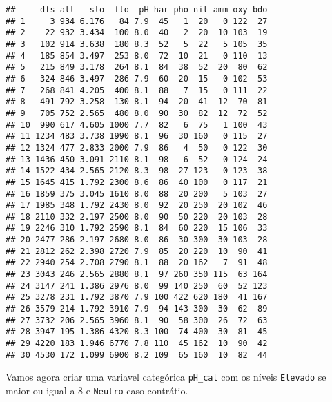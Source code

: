 \documentclass[
]{book}
\newenvironment{Shaded}{\begin{snugshade}}{\end{snugshade}}
\newcommand{\DataTypeTok}[1]{\textcolor[rgb]{0.13,0.29,0.53}{#1}}
\newcommand{\DecValTok}[1]{\textcolor[rgb]{0.00,0.00,0.81}{#1}}
\newcommand{\KeywordTok}[1]{\textcolor[rgb]{0.13,0.29,0.53}{\textbf{#1}}}
\newcommand{\NormalTok}[1]{#1}
\newcommand{\OperatorTok}[1]{\textcolor[rgb]{0.81,0.36,0.00}{\textbf{#1}}}
\newcommand{\StringTok}[1]{\textcolor[rgb]{0.31,0.60,0.02}{#1}}
\begin{document}
\begin{verbatim}
##     dfs alt   slo  flo  pH har pho nit amm oxy bdo
## 1     3 934 6.176   84 7.9  45   1  20   0 122  27
## 2    22 932 3.434  100 8.0  40   2  20  10 103  19
## 3   102 914 3.638  180 8.3  52   5  22   5 105  35
## 4   185 854 3.497  253 8.0  72  10  21   0 110  13
## 5   215 849 3.178  264 8.1  84  38  52  20  80  62
## 6   324 846 3.497  286 7.9  60  20  15   0 102  53
## 7   268 841 4.205  400 8.1  88   7  15   0 111  22
## 8   491 792 3.258  130 8.1  94  20  41  12  70  81
## 9   705 752 2.565  480 8.0  90  30  82  12  72  52
## 10  990 617 4.605 1000 7.7  82   6  75   1 100  43
## 11 1234 483 3.738 1990 8.1  96  30 160   0 115  27
## 12 1324 477 2.833 2000 7.9  86   4  50   0 122  30
## 13 1436 450 3.091 2110 8.1  98   6  52   0 124  24
## 14 1522 434 2.565 2120 8.3  98  27 123   0 123  38
## 15 1645 415 1.792 2300 8.6  86  40 100   0 117  21
## 16 1859 375 3.045 1610 8.0  88  20 200   5 103  27
## 17 1985 348 1.792 2430 8.0  92  20 250  20 102  46
## 18 2110 332 2.197 2500 8.0  90  50 220  20 103  28
## 19 2246 310 1.792 2590 8.1  84  60 220  15 106  33
## 20 2477 286 2.197 2680 8.0  86  30 300  30 103  28
## 21 2812 262 2.398 2720 7.9  85  20 220  10  90  41
## 22 2940 254 2.708 2790 8.1  88  20 162   7  91  48
## 23 3043 246 2.565 2880 8.1  97 260 350 115  63 164
## 24 3147 241 1.386 2976 8.0  99 140 250  60  52 123
## 25 3278 231 1.792 3870 7.9 100 422 620 180  41 167
## 26 3579 214 1.792 3910 7.9  94 143 300  30  62  89
## 27 3732 206 2.565 3960 8.1  90  58 300  26  72  63
## 28 3947 195 1.386 4320 8.3 100  74 400  30  81  45
## 29 4220 183 1.946 6770 7.8 110  45 162  10  90  42
## 30 4530 172 1.099 6900 8.2 109  65 160  10  82  44
\end{verbatim}

Vamos agora criar uma variavel categórica \texttt{pH\_cat} com os níveis \texttt{Elevado} se maior ou igual a 8 e \texttt{Neutro} caso contrátio.

\begin{Shaded}
\end{Shaded}
\end{document}
